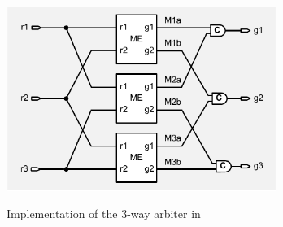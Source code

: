 
\begin{figure}[!t]
\begin{center}

\includegraphics[height=6cm]{figures/fig_arbiter}

\caption{
Implementation of the 3-way arbiter in 
}

\vspace{-0.6cm}

\label{fig_arbiter}
\end{center}

\end{figure}
